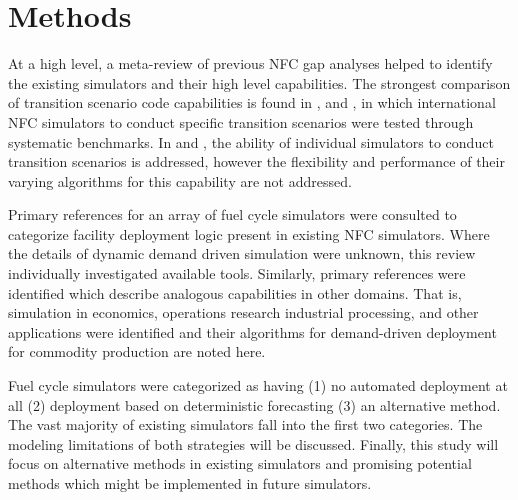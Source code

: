 \section{Methods}
At a high level, a meta-review of previous \gls{NFC} gap analyses 
helped to identify the existing simulators and their high 
level capabilities. The strongest comparison of transition scenario code 
capabilities is found in \cite{boucher_international_2010}, 
\cite{brown_identification_2016} and \cite{mccarthy_benchmark_2012}, in which 
international \gls{NFC} simulators to conduct specific transition scenarios 
were tested through systematic benchmarks. In 
\cite{carre_overview_2009} and \cite{hoffman_expanded_2016}, the ability of individual 
simulators to conduct transition scenarios is addressed, however the 
flexibility and performance of their varying algorithms for this capability are 
not addressed.

Primary references for an array of fuel cycle simulators were consulted to 
categorize facility deployment logic present in existing \gls{NFC} simulators. 
Where the details of dynamic demand driven simulation were unknown, this review 
individually investigated available tools.  Similarly, primary references were 
identified which describe analogous capabilities in other domains. That is, 
simulation in economics, operations research industrial processing, and other 
applications were identified and their algorithms for demand-driven deployment 
for commodity production are noted here.

Fuel cycle simulators were categorized as having (1) no automated deployment at all (2) 
deployment based on deterministic forecasting (3) an alternative method. The 
vast majority of existing simulators fall into the first two categories. 
The modeling limitations of both strategies will be discussed. Finally, this 
study will focus on alternative methods in existing simulators and 
promising potential methods which might be implemented in future simulators.  
